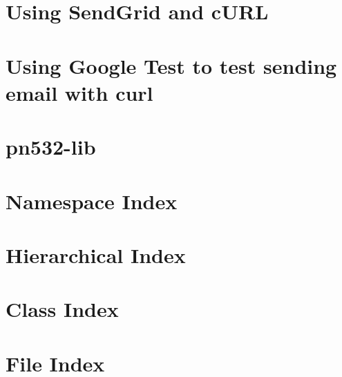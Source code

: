 \documentclass[twoside]{book}
\newcommand{\+}{\discretionary{\mbox{\scriptsize$\hookleftarrow$}}{}{}}
\begin{document}
\chapter{Using Send\+Grid and c\+U\+R\+L}
\label{md__e_1__glasgow__course__works__realtime__embeded__programming__project_files__course_project__6ecd2122ae19d76dd13ef261c759d135}
\hypertarget{md__e_1__glasgow__course__works__realtime__embeded__programming__project_files__course_project__6ecd2122ae19d76dd13ef261c759d135}{}

\chapter{Using Google Test to test sending email with curl}
\label{md__e_1__glasgow__course__works__realtime__embeded__programming__project_files__course_project__e86b36782d5401296b73857b583e37d5}
\hypertarget{md__e_1__glasgow__course__works__realtime__embeded__programming__project_files__course_project__e86b36782d5401296b73857b583e37d5}{}

\chapter{pn532-\/lib}
\label{md__e_1__glasgow__course__works__realtime__embeded__programming__project_files__course_project__44069a415028aa789c8f22b69f919b89}
\hypertarget{md__e_1__glasgow__course__works__realtime__embeded__programming__project_files__course_project__44069a415028aa789c8f22b69f919b89}{}

\chapter{Namespace Index}

\chapter{Hierarchical Index}

\chapter{Class Index}

\chapter{File Index}

\end{document}
